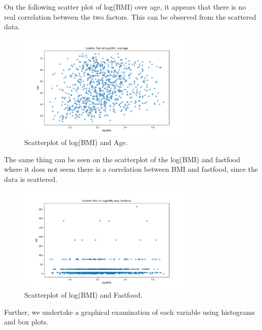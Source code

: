 \documentclass{rapport}
\begin{document}
\hspace{20 mm}

\noindent
On the following scatter plot of log(BMI) over age, it appears that there is no real correlation between the two factors. This can be observed from the scattered data.

\begin{figure}[H]
    \centering
    \includegraphics[width=0.75\textwidth]{Figures/scatter_plot_1.png}  %
    \caption{\small Scatterplot of log(BMI) and Age.}  %
    \label{fig:scatterplot_1}
\end{figure}
\noindent
\noindent
The same thing can be seen on the scatterplot of the log(BMI) and fastfood where it does not seem there is a correlation between BMI and fastfood, since the data is scattered. 

\begin{figure}[H]
    \centering
    \includegraphics[width=0.75\textwidth]{Figures/scatter_plot_2.png}  %
    \caption{\small Scatterplot of log(BMI) and Fastfood.}  %
    \label{fig:scatterplot_1}
\end{figure}
\noindent
\noindent
Further, we undertake a graphical examination of each variable using histograms and box plots. 
\end{document}
